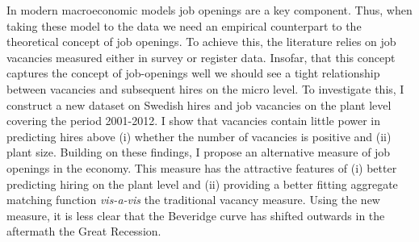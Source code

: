 In modern macroeconomic models job openings are a key component. Thus, when taking these model to the data we need an empirical counterpart to the theoretical concept of job openings. To achieve this, the literature relies on job vacancies measured either in survey or register data. Insofar, that this concept captures the concept of job-openings well we should see a tight relationship between vacancies and subsequent hires on the micro level. To investigate this, I construct a new dataset on Swedish hires and job vacancies on the plant level covering the period 2001-2012. I show that vacancies contain little power in predicting hires above (i) whether the number of vacancies is positive and (ii) plant size. Building on these findings, I propose an alternative measure of job openings in the economy. This measure has the attractive features of (i) better predicting hiring on the plant level and (ii) providing a better fitting aggregate matching function \emph{vis-a-vis} the traditional vacancy measure. Using the new measure, it is less clear that the Beveridge curve has shifted outwards in the aftermath the Great Recession.

